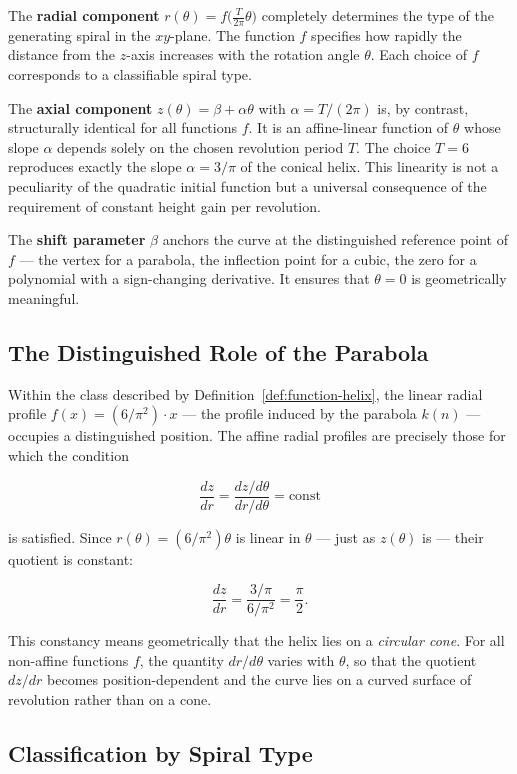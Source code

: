 The \textbf{radial component}
$r(\theta) = f\!\bigl(\tfrac{T}{2\pi}\theta\bigr)$ completely determines
the type of the generating spiral in the $xy$-plane. The function $f$
specifies how rapidly the distance from the $z$-axis increases with the
rotation angle $\theta$. Each choice of $f$ corresponds to a classifiable
spiral type.

The \textbf{axial component} $z(\theta) = \beta + \alpha\theta$ with
$\alpha = T/(2\pi)$ is, by contrast, structurally identical for all
functions $f$. It is an affine-linear function of $\theta$ whose slope
$\alpha$ depends solely on the chosen revolution period $T$. The choice
$T = 6$ reproduces exactly the slope $\alpha = 3/\pi$ of the conical
helix. This linearity is not a peculiarity of the quadratic initial
function but a universal consequence of the requirement of constant
height gain per revolution.

The \textbf{shift parameter} $\beta$ anchors the curve at the
distinguished reference point of $f$ --- the vertex for a parabola, the
inflection point for a cubic, the zero for a polynomial with a
sign-changing derivative. It ensures that $\theta = 0$ is geometrically
meaningful.

\subsection{The Distinguished Role of the Parabola}

Within the class described by Definition~\ref{def:function-helix}, the
linear radial profile $f(x) = (6/\pi^2)\cdot x$ --- the profile induced
by the parabola $k(n)$ --- occupies a distinguished position. The
affine radial profiles are precisely those for which the condition

\[
\frac{dz}{dr} = \frac{dz/d\theta}{dr/d\theta} = \text{const}
\]

is satisfied. Since $r(\theta) = (6/\pi^2)\theta$ is linear in
$\theta$ --- just as $z(\theta)$ is --- their quotient is constant:

\[
\frac{dz}{dr}
= \frac{3/\pi}{6/\pi^2}
= \frac{\pi}{2}.
\]

This constancy means geometrically that the helix lies on a
\emph{circular cone}. For all non-affine functions $f$, the quantity
$dr/d\theta$ varies with $\theta$, so that the quotient $dz/dr$ becomes
position-dependent and the curve lies on a curved surface of revolution
rather than on a cone.

\subsection{Classification by Spiral Type}

